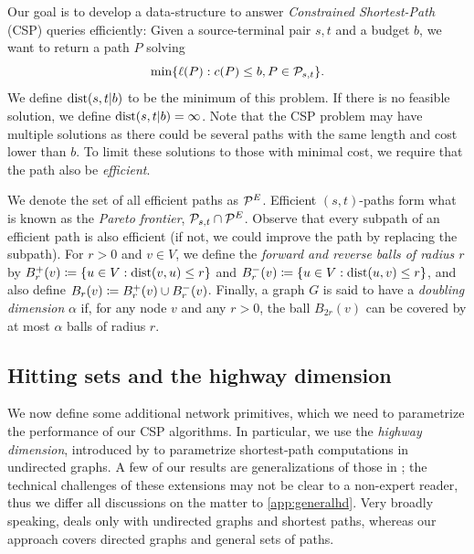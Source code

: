 \documentclass[opre,nonblindrev]{informs3} %
\begin{document}
Our goal is to develop a data-structure to answer \emph{Constrained Shortest-Path} (CSP) queries efficiently: 
Given a source-terminal pair $s,t$ and a budget $b$, we want to return a path $P$ solving
\[
\min\{\ell(P):c(P) \leq b, P \in \mathcal{P}_{s,t} \}.
\]
We define $\mbox{dist}(s,t|b)$ to be the minimum of this problem.
If there is no feasible solution, we define $\mbox{dist}(s,t|b)=\infty$.
Note that the CSP problem may have multiple solutions as there could be several paths with the same length and cost lower than $b$.
To limit these solutions to those with minimal cost, we require that the path also be \emph{efficient}. 
We denote the set of all efficient paths as $\mathcal{P}^E$.
Efficient $(s,t)$-paths form what is known as the \emph{Pareto frontier}, $\mathcal{P}_{s,t}\cap\mathcal{P}^E$.
Observe that every subpath of an efficient path is also efficient (if not, we could improve the path by replacing the subpath).
For $r>0$ and $v\in V$, we define the \emph{forward and reverse balls of radius $r$} by $B^+_r(v)\coloneqq\{u\in V: \mbox{dist}(v,u)\leq r\}$ and $B^-_r(v)\coloneqq\{u\in V: \mbox{dist}(u,v)\leq r\}$, and also define $B_r(v)\coloneqq B^+_r(v)\cup B^-_r(v)$.
Finally, a graph $G$ is said to have a \emph{doubling dimension} $\alpha$ if, for any node $v$ and any $r>0$, the ball $B_{2r}(v)$ can be covered by at most $\alpha$ balls of radius $r$.

\subsection{Hitting sets and the highway dimension}
\label{ssec:hddef}
We now define some additional network primitives, which we need to parametrize the performance of our CSP algorithms. 
In particular, we use the \emph{highway dimension}, introduced by \citep{highway2013,highway2010} to parametrize shortest-path computations in undirected graphs. 
A few of our results are generalizations of those in \citep{highway2013}; the technical challenges of these extensions may not be clear to a non-expert reader, thus we differ all discussions on the matter to \cref{app:generalhd}. 
Very broadly speaking, \cite{highway2013} deals only with undirected graphs and shortest paths, whereas our approach covers directed graphs and general sets of paths.
\end{document}
